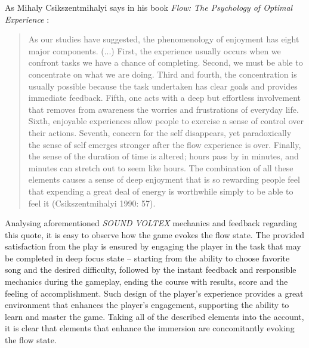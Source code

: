 As Mihaly Csikszentmihalyi says in his book \textit{Flow: The Psychology of Optimal Experience} \cite{csikszentmihalyi1990flow}:
\begin{quote}
    As our studies have suggested, the phenomenology of enjoyment has eight major components. (...) First, the experience usually occurs when we confront tasks we have a chance of completing. Second, we must be able to concentrate on what we are doing. Third and fourth, the concentration is usually possible because the task undertaken has clear goals and provides immediate feedback. Fifth, one acts with a deep but effortless involvement that removes from awareness the worries and frustrations of everyday life. Sixth, enjoyable experiences allow people to exercise a sense of control over their actions. Seventh, concern for the self disappears, yet paradoxically the sense of self emerges stronger after the flow experience is over. Finally, the sense of the duration of time is altered; hours pass by in minutes, and minutes can stretch out to seem like hours. The
    combination of all these elements causes a sense of deep enjoyment that is so rewarding people feel that expending a great deal of energy is worthwhile simply to be able to feel it (Csikszentmihalyi 1990: 57).
\end{quote}

Analysing aforementioned \textit{SOUND VOLTEX} mechanics and feedback regarding this quote, it is easy to observe how the game evokes the flow state. The provided satisfaction from the play is ensured by engaging the player in the task that may be completed in deep focus state -- starting from the ability to choose favorite song and the desired difficulty, followed by the instant feedback and responsible mechanics during the gameplay, ending the course with results, score and the feeling of accomplishment. Such design of the player’s experience provides a great environment that enhances the player’s engagement, supporting the ability to learn and master the game. Taking all of the described elements into the account, it is clear that elements that enhance the immersion are concomitantly evoking the flow state.

